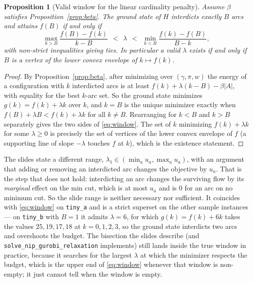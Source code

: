 \documentclass[11pt]{article}
\newcommand{\code}[1]{\texttt{#1}}
\newtheorem{proposition}{Proposition}
\begin{document}
\begin{proposition}[Valid window for the linear cardinality penalty]
\label{prop:lambda}
Assume $\beta$ satisfies Proposition~\ref{prop:beta}. The ground state of $H$ interdicts exactly $B$ arcs and attains $f(B)$ if and only if
\begin{equation}
\label{eq:window}
\max_{k > B} \frac{f(B) - f(k)}{k - B}\ \ <\ \ \lambda\ \ <\ \ \min_{k < B} \frac{f(k) - f(B)}{B - k},
\end{equation}
with non-strict inequalities giving ties. In particular a valid $\lambda$ exists if and only if $B$ is a vertex of the lower convex envelope of $k \mapsto f(k)$.
\end{proposition}
\begin{proof}
By Proposition~\ref{prop:beta}, after minimizing over $(\gamma,\pi,w)$ the energy of a configuration with $k$ interdicted arcs is at least $f(k) + \lambda(k-B) - \beta|A|$, with equality for the best $k$-arc set. So the ground state minimizes $g(k) = f(k) + \lambda k$ over $k$, and $k=B$ is the unique minimizer exactly when $f(B)+\lambda B < f(k)+\lambda k$ for all $k \ne B$. Rearranging for $k<B$ and $k>B$ separately gives the two sides of \eqref{eq:window}. The set of $k$ minimizing $f(k)+\lambda k$ for some $\lambda \ge 0$ is precisely the set of vertices of the lower convex envelope of $f$ (a supporting line of slope $-\lambda$ touches $f$ at $k$), which is the existence statement.
\end{proof}

The slides state a different range, $\lambda_1 \in (\min_a u_a, \max_a u_a)$, with an argument that adding or removing an interdicted arc changes the objective by $u_a$. That is the step that does not hold: interdicting an arc changes the surviving flow by its \emph{marginal} effect on the min cut, which is at most $u_a$ and is $0$ for an arc on no minimum cut. So the slide range is neither necessary nor sufficient. It coincides with \eqref{eq:window} on \code{tiny\_a} and is a strict superset on the other sample instances --- on \code{tiny\_b} with $B=1$ it admits $\lambda = 6$, for which $g(k) = f(k)+6k$ takes the values $25, 19, 17, 18$ at $k=0,1,2,3$, so the ground state interdicts two arcs and overshoots the budget. The bisection the slides describe (and \code{solve\_nip\_gurobi\_relaxation} implements) still lands inside the true window in practice, because it searches for the largest $\lambda$ at which the minimizer respects the budget, which is the upper end of \eqref{eq:window} whenever that window is non-empty; it just cannot tell when the window is empty.
\end{document}
